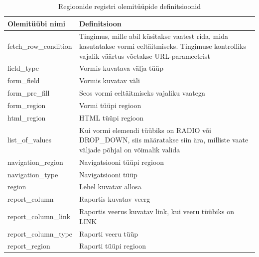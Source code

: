 \documentclass[a4paper,12pt]{article} %
\begin{document}
\begin{table}[H]
\centering
\caption{Regioonide registri olemitüüpide definitsioonid}
\label{table_er_regioonide_registri_olemitüüpide_definitsioonid}
\begin{tabular}{|p{4cm}|p{11cm}|}
\hline
\rowcolor{rowgray}
Olemitüübi nimi & Definitsioon \\ \hline
fetch\_row\_condition & Tingimus, mille abil küsitakse vaatest rida, mida kasutatakse vormi eeltäitmiseks. Tingimuse kontrolliks vajalik väärtus võetakse URL-parameetrist \\ \hline
field\_type & Vormis kuvatava välja tüüp \\ \hline
form\_field & Vormis kuvatav väli \\ \hline
form\_pre\_fill & Seos vormi eeltäitmiseks vajaliku vaatega \\ \hline
form\_region & Vormi tüüpi regioon \\ \hline
html\_region & HTML tüüpi regioon \\ \hline
list\_of\_values & Kui vormi elemendi tüübiks on RADIO või DROP\_DOWN, siis määratakse siin ära, milliste vaate väljade põhjal on võimalik valida \\ \hline
navigation\_region & Navigatsiooni tüüpi regioon \\ \hline
navigation\_type & Navigatsiooni tüüp\\ \hline
region & Lehel kuvatav allosa \\ \hline
report\_column & Raportis kuvatav veerg \\ \hline
report\_column\_link & Raportis veerus kuvatav link, kui veeru tüübiks on LINK \\ \hline
report\_column\_type & Raporti veeru tüüp \\ \hline
report\_region & Raporti tüüpi regioon \\ \hline
\end{tabular}
\end{table}
\end{document}
